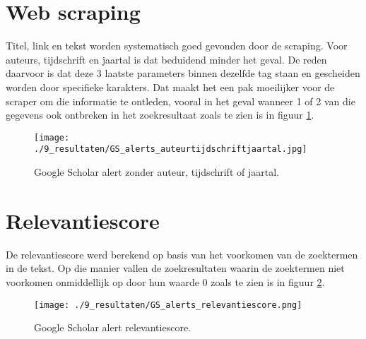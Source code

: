 \section{Web scraping}
Titel, link en tekst worden systematisch goed gevonden door de scraping. Voor auteurs, tijdschrift en jaartal is dat beduidend minder het geval. De reden daarvoor is dat deze 3 laatste parameters binnen dezelfde tag staan en gescheiden worden door specifieke karakters. Dat maakt het een pak moeilijker voor de scraper om die informatie te  ontleden, vooral in het geval wanneer 1 of 2 van die gegevens ook ontbreken in het zoekresultaat zoals te zien is in figuur \ref{fig:GSauteurtijdschriftjaartal}.
\begin{figure}[h!]
    \centering
    \texttt{[image: ./9\_resultaten/GS\_alerts\_auteurtijdschriftjaartal.jpg]}
    \caption[Google Scholar alert zonder auteur, tijdschrift of jaartal.]{\label{fig:GSauteurtijdschriftjaartal}Google Scholar alert zonder auteur, tijdschrift of jaartal.}
\end{figure}

\section{Relevantiescore}
De relevantiescore werd berekend op basis van het voorkomen van de zoektermen in de tekst. Op die manier vallen de zoekresultaten waarin de zoektermen niet voorkomen onmiddellijk op door hun waarde 0 zoals te zien is in figuur  \ref{fig:GSrelevantie}.
\begin{figure}[h!]
    \centering
    \texttt{[image: ./9\_resultaten/GS\_alerts\_relevantiescore.png]}
    \caption[Google Scholar alert relevantiescore.]{\label{fig:GSrelevantie}Google Scholar alert relevantiescore.}
\end{figure}


